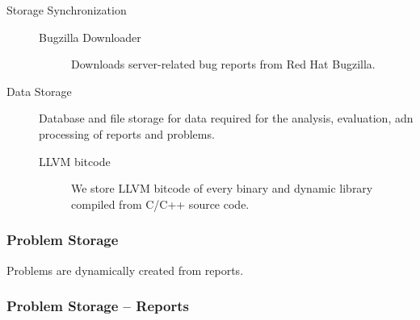 \documentclass{article}
\begin{document}
\begin{description}
\item[Storage Synchronization]
  \begin{description}
  \item[Bugzilla Downloader] Downloads server-related bug reports from
    Red Hat Bugzilla.
  \end{description}
\item[Data Storage] Database and file storage for data required for
  the analysis, evaluation, adn processing of reports and problems.
  \begin{description}
  \item[LLVM bitcode] We store LLVM bitcode of every binary and
    dynamic library compiled from C/C++ source code.
  \end{description}
\end{description}

\subsubsection{Problem Storage}
\begin{center}
\end{center}

Problems are dynamically created from reports.

\vfill
\subsubsection{Problem Storage -- Reports}
\end{document}
